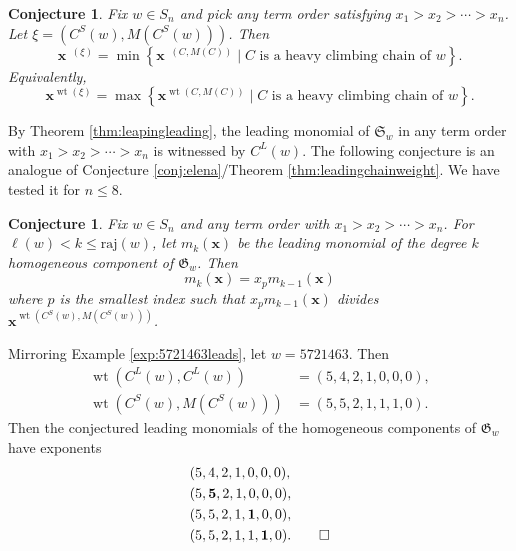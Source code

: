\documentclass[11pt]{amsart}
\newtheorem{conjecture}[theorem]{Conjecture}
\theoremstyle{definition}
\newenvironment{example}
{\pushQED{\qed}\renewcommand{\qedsymbol}{$\diamondsuit$}\examplex}
{\popQED\endexamplex}
\theoremstyle{named}
\newcommand{\CL}{C^L}
\newcommand{\CS}{C^S}
\newcommand{\absrajcode}[1]{\mathrm{raj}(#1)}
\DeclareMathOperator{\wt}{\mathrm{wt}}
\DeclareMathOperator{\dwt}{\overline{\mathrm{wt}}}
\begin{document}
	\begin{conjecture}
		\label{conj:staircaseleading}
		Fix $w\in S_n$ and pick any term order satisfying $x_1>x_2>\cdots>x_n$. Let $\xi=(\CS(w),M(\CS(w)))$. Then
		\[\bm{x}^{\dwt(\xi)} = \min \left\{\bm{x}^{\dwt(C,M(C))} \mid C \mbox{ is a heavy climbing chain of } w \right\}. \] 
		Equivalently,
		\[\bm{x}^{\wt(\xi)} = \max \left\{\bm{x}^{\wt(C,M(C))} \mid C \mbox{ is a heavy climbing chain of } w \right\}. \] 
	\end{conjecture}
	 
	 
	 By Theorem \ref{thm:leapingleading}, the leading monomial of $\mathfrak{S}_w$ in any term order with $x_1>x_2>\cdots>x_n$ is witnessed by $\CL(w)$. The following conjecture is an analogue of Conjecture \ref{conj:elena}/Theorem \ref{thm:leadingchainweight}. We have tested it for $n\leq 8$.
	\begin{conjecture}
		\label{conj:reverseinterpolating}
		Fix $w\in S_n$ and any term order with $x_1>x_2>\cdots>x_n$. For $\ell(w)< k\leq \absrajcode{w}$, let $m_k(\bm{x})$ be the leading monomial of the degree $k$ homogeneous component of $\mathfrak{G}_w$. Then
		\[m_k(\bm{x}) = x_pm_{k-1}(\bm{x}) \]
		where $p$ is the smallest index such that $x_p m_{k-1}(\bm{x})$ divides $\bm{x}^{\wt(\CS(w),M(\CS(w)))}$.
	\end{conjecture}

	\begin{example}
		Mirroring Example \ref{exp:5721463leads}, let $w=5721463$. Then
		\begin{align*}
			\wt(\CL(w),\CL(w)) &= (5, 4, 2, 1, 0, 0, 0),\\
			\wt(\CS(w),M(\CS(w))) &= (5, 5, 2, 1, 1, 1, 0).
		\end{align*}
		Then the conjectured leading monomials of the homogeneous components of $\mathfrak{G}_w$ have exponents
		\begin{align*}
			&(5, 4, 2, 1, 0, 0, 0),\\
			&(5, \textbf{5}, 2, 1, 0, 0, 0),\\
			&(5, 5, 2, 1, \textbf{1}, 0, 0),\\
			&(5, 5, 2, 1, 1, \textbf{1}, 0).\qedhere
		\end{align*}
	\end{example}
	
	
	
	
\end{document}
